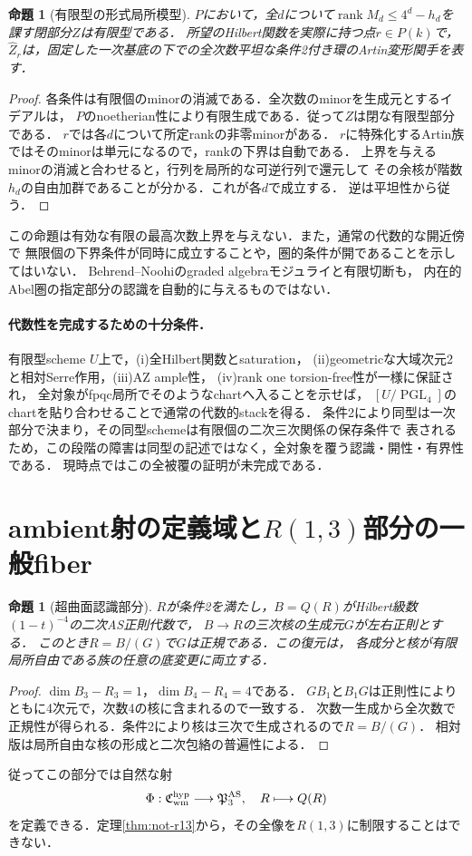\documentclass[11pt,a4paper]{ltjsarticle}
\newtheorem{proposition}[theorem]{命題}
\theoremstyle{definition}\newtheorem{definition}[theorem]{定義}
\newcommand{\rank}{\operatorname{rank}}\newcommand{\gldim}{\operatorname{gldim}}
\newcommand{\PGL}{\operatorname{PGL}}\newcommand{\GL}{\operatorname{GL}}
\newcommand{\cP}{\mathfrak P}\newcommand{\Sym}{\operatorname{Sym}}
\begin{document}
\begin{proposition}[有限型の形式局所模型]\label{prop:hull}
$P$において，全$d$について$\rank M_d\le4^d-h_d$を課す閉部分$Z$は有限型である．
所望のHilbert関数を実際に持つ点$r\in P(k)$で，
$\widehat Z_r$は，固定した一次基底の下での全次数平坦な条件2付き環のArtin変形関手を表す．
\end{proposition}
\begin{proof}
各条件は有限個のminorの消滅である．全次数のminorを生成元とするイデアルは，
$P$のnoetherian性により有限生成である．従って$Z$は閉な有限型部分である．
$r$では各$d$について所定rankの非零minorがある．
$r$に特殊化するArtin族ではそのminorは単元になるので，rankの下界は自動である．
上界を与えるminorの消滅と合わせると，行列を局所的な可逆行列で還元して
その余核が階数$h_d$の自由加群であることが分かる．これが各$d$で成立する．
逆は平坦性から従う．
\end{proof}
この命題は有効な有限の最高次数上界を与えない．また，通常の代数的な開近傍で
無限個の下界条件が同時に成立することや，圏的条件が開であることを示してはいない．
Behrend--Noohi\cite{BN}のgraded algebraモジュライと有限切断も，
内在的Abel圏の指定部分の認識を自動的に与えるものではない．

\paragraph{代数性を完成するための十分条件．}
有限型scheme $U$上で，(i)全Hilbert関数とsaturation，
(ii)geometricな大域次元2と相対Serre作用，(iii)AZ ample性，
(iv)rank one torsion-free性が一様に保証され，
全対象がfpqc局所でそのようなchartへ入ることを示せば，
$[U/\PGL_4]$のchartを貼り合わせることで通常の代数的stackを得る．
条件2により同型は一次部分で決まり，その同型schemeは有限個の二次三次関係の保存条件で
表されるため，この段階の障害は同型の記述ではなく，全対象を覆う認識・開性・有界性である．
現時点ではこの全被覆の証明が未完成である．

\section{ambient射の定義域と$R(1,3)$部分の一般fiber}
\begin{proposition}[超曲面認識部分]\label{prop:recognition}
$R$が条件2を満たし，$B=Q(R)$がHilbert級数$(1-t)^{-4}$の二次AS正則代数で，
$B\to R$の三次核の生成元$G$が左右正則とする．
このとき$R=B/(G)$で$G$は正規である．この復元は，
各成分と核が有限局所自由である族の任意の底変更に両立する．
\end{proposition}
\begin{proof}
$\dim B_3-R_3=1$，$\dim B_4-R_4=4$である．
$GB_1$と$B_1G$は正則性によりともに4次元で，次数4の核に含まれるので一致する．
次数一生成から全次数で正規性が得られる．条件2により核は三次で生成されるので$R=B/(G)$．
相対版は局所自由な核の形成と二次包絡の普遍性による．
\end{proof}
従ってこの部分では自然な射
\[
 \Phi:\cC^{\mathrm{hyp}}_{\mathrm{wm}}\longrightarrow\cP_3^{\mathrm{AS}},\quad
 R\longmapsto Q(R)
\]
を定義できる．定理\ref{thm:not-r13}から，その全像を$R(1,3)$に制限することはできない．
\end{document}
